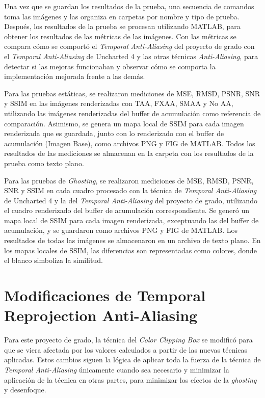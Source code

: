 \documentclass[pregrado]{tesis-usb} %
\begin{document}
Una vez que se guardan los resultados de la prueba, una secuencia de comandos toma las imágenes y las organiza en carpetas por nombre y tipo de prueba. Después, los resultados de la prueba se procesan utilizando MATLAB, para obtener los resultados de las métricas de las imágenes. Con las métricas se compara cómo se comportó el \textit{Temporal Anti-Aliasing} del proyecto de grado con el \textit{Temporal Anti-Aliasing} de Uncharted 4 y las otras técnicas \textit{Anti-Aliasing}, para detectar si las mejoras funcionaban y observar cómo se comporta la implementación mejorada frente a las demás.

Para las pruebas estáticas, se realizaron mediciones de MSE, RMSD, PSNR, SNR y SSIM en las imágenes renderizadas con TAA, FXAA, SMAA y No AA, utilizando las imágenes renderizadas del buffer de acumulación como referencia de comparación. Asimismo, se genera un mapa local de SSIM para cada imagen renderizada que es guardada, junto con lo renderizado con el buffer de acumulación (Imagen Base), como archivos PNG y FIG de MATLAB. Todos los resultados de las mediciones se almacenan en la carpeta con los resultados de la prueba como texto plano.

Para las pruebas de \textit{Ghosting}, se realizaron mediciones de MSE, RMSD, PSNR, SNR y SSIM en cada cuadro procesado con la técnica de \textit{Temporal Anti-Aliasing} de Uncharted 4 y la del \textit{Temporal Anti-Aliasing} del proyecto de grado, utilizando el cuadro renderizado del buffer de acumulación correspondiente. Se generó un mapa local de SSIM para cada imagen renderizada, exceptuando las del buffer de acumulación, y se guardaron como archivos PNG y FIG de MATLAB. Los resultados de todas las imágenes se almacenaron en un archivo de texto plano. En los mapas locales de SSIM, las diferencias son representadas como colores, donde el blanco simboliza la similitud.


\section[Modificaciones de Temporal Reprojection Anti-Aliasing ]{Modificaciones de Temporal Reprojection Anti-Aliasing }
Para este proyecto de grado, la técnica del \textit{Color Clipping Box} se modificó para que se viera afectada por los valores calculados a partir de las nuevas técnicas aplicadas. Estos cambios siguen la lógica de aplicar toda la fuerza de la técnica de \textit{Temporal Anti-Aliasing} únicamente cuando sea necesario y minimizar la aplicación de la técnica en otras partes, para minimizar los efectos de la \textit{ghosting} y desenfoque.
\end{document}
